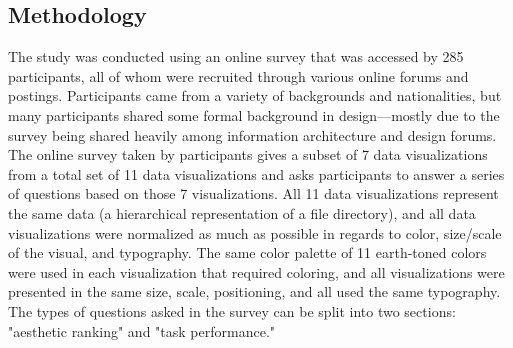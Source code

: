 \documentclass[twocolumn]{article}
\newcommand{\forceindent}{\leavevmode{\parindent=2em\indent}}
\begin{document}
		\subsection{Methodology}
		
		\forceindent The study was conducted using an online survey that was accessed by 285 participants, all of whom were recruited through various online forums and postings. Participants came from a variety of backgrounds and nationalities, but many participants shared some formal background in design—mostly due to the survey being shared heavily among information architecture and design forums. The online survey taken by participants gives a subset of 7 data visualizations from a total set of 11 data visualizations and asks participants to answer a series of questions based on those 7 visualizations. All 11 data visualizations represent the same data (a hierarchical representation of a file directory), and all data visualizations were normalized as much as possible in regards to color, size/scale of the visual, and typography. The same color palette of 11 earth-toned colors were used in each visualization that required coloring, and all visualizations were presented in the same size, scale, positioning, and all used the same typography. The types of questions asked in the survey can be split into two sections: "aesthetic ranking" and "task performance." 
		
\end{document}
